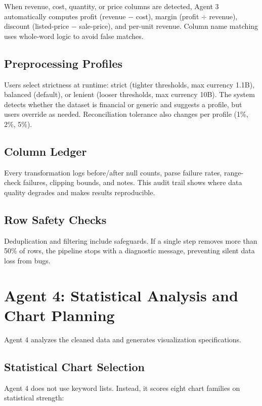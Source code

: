 When revenue, cost, quantity, or price columns are detected, Agent 3 automatically computes profit (revenue $-$ cost), margin (profit $\div$ revenue), discount (listed-price $-$ sale-price), and per-unit revenue. Column name matching uses whole-word logic to avoid false matches.

\subsection{Preprocessing Profiles}

Users select strictness at runtime: strict (tighter thresholds, max currency 1.1B), balanced (default), or lenient (looser thresholds, max currency 10B). The system detects whether the dataset is financial or generic and suggests a profile, but users override as needed. Reconciliation tolerance also changes per profile (1\%, 2\%, 5\%).

\subsection{Column Ledger}

Every transformation logs before/after null counts, parse failure rates, range-check failures, clipping bounds, and notes. This audit trail shows where data quality degrades and makes results reproducible.

\subsection{Row Safety Checks}

Deduplication and filtering include safeguards. If a single step removes more than 50\% of rows, the pipeline stops with a diagnostic message, preventing silent data loss from bugs.

\section{Agent 4: Statistical Analysis and Chart Planning}

Agent 4 analyzes the cleaned data and generates visualization specifications.

\subsection{Statistical Chart Selection}

Agent 4 does not use keyword lists. Instead, it scores eight chart families on statistical strength:

